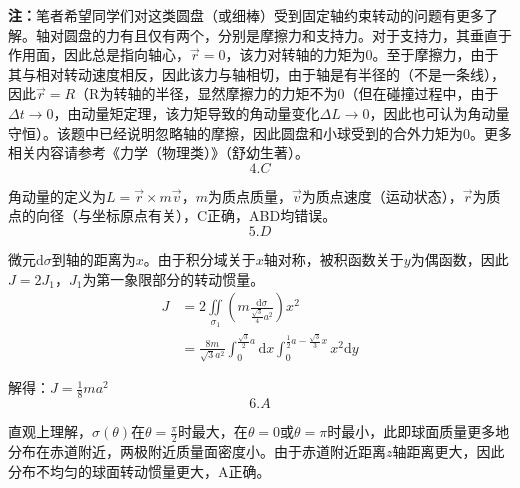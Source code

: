 \documentclass[blue, pad]{./templete/qyxfnote}
\newcommand{\di}[1]{\mathrm{d}#1}
\newcommand{\zbj}[4]
{
	\draw (0,0) node[below left] {$ O $};
	\draw [->] (#1,0) -- (#2,0) node[right] {$ x $};
	\draw [->] (0,#3) -- (0,#4) node[right] {$ y $};
}
\begin{document}
			\textbf{\Large 注：}笔者希望同学们对这类圆盘（或细棒）受到固定轴约束转动的问题有更多了解。轴对圆盘的力有且仅有两个，分别是摩擦力和支持力。对于支持力，其垂直于作用面，因此总是指向轴心，$ \vec{r}=0 $，该力对转轴的力矩为0。至于摩擦力，由于其与相对转动速度相反，因此该力与轴相切，由于轴是有半径的（不是一条线），因此$ \vec{r}=R $（R为转轴的半径，显然摩擦力的力矩不为0（但在碰撞过程中，由于$ \Delta t\to 0 $，由动量矩定理，该力矩导致的角动量变化$ \Delta L\to 0 $，因此也可认为角动量守恒）。该题中已经说明忽略轴的摩擦，因此圆盘和小球受到的合外力矩为0。更多相关内容请参考《力学（物理类）》（舒幼生著）。
			\[4.C\]\par
			角动量的定义为$ L=\vec{r}\times m\vec{v} $，$ m $为质点质量，$ \vec{v} $为质点速度（运动状态），$ \vec{r} $为质点的向径（与坐标原点有关），C正确，ABD均错误。
			\[5.D\]\par
			\par
			微元$ \di{\sigma} $到轴的距离为$ x $。由于积分域关于$ x $轴对称，被积函数关于$ y $为偶函数，因此$ J=2J_1 $，$ J_1 $为第一象限部分的转动惯量。
			\begin{align*}
			J&=2\iint\limits_{\sigma_1}\left(m\frac{\di{\sigma}}{\frac{\sqrt{3}}{4}a^2}\right)x^2\\
			&=\frac{8m}{\sqrt{3}a^2}\int_0^{\frac{\sqrt{3}}{2}a}\di{x}\int_0^{\frac{1}{2}a-\frac{\sqrt{3}}{3}x}x^2\di{y}
			\end{align*}\par
			解得：$ J=\frac{1}{8}ma^2 $
			\[6.A\]\par
			直观上理解，$ \sigma(\theta) $在$ \theta=\frac{\pi}{2} $时最大，在$ \theta=0 $或$ \theta=\pi $时最小，此即球面质量更多地分布在赤道附近，两极附近质量面密度小。由于赤道附近距离$ z $轴距离更大，因此分布不均匀的球面转动惯量更大，A正确。\par
\end{document}
